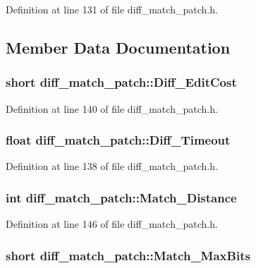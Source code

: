 Definition at line 131 of file diff\_\-match\_\-patch.h.



\subsection{Member Data Documentation}
\hypertarget{classdiff__match__patch_a3a7134ca63b7e4cb44a2432ef4c34121}{
\subsubsection[{Diff\_\-EditCost}]{\setlength{\rightskip}{0pt plus 5cm}short {\bf diff\_\-match\_\-patch::Diff\_\-EditCost}}}
\label{classdiff__match__patch_a3a7134ca63b7e4cb44a2432ef4c34121}


Definition at line 140 of file diff\_\-match\_\-patch.h.

\hypertarget{classdiff__match__patch_aaa544a91d8555a780ab261fc1c15b3f9}{
\subsubsection[{Diff\_\-Timeout}]{\setlength{\rightskip}{0pt plus 5cm}float {\bf diff\_\-match\_\-patch::Diff\_\-Timeout}}}
\label{classdiff__match__patch_aaa544a91d8555a780ab261fc1c15b3f9}


Definition at line 138 of file diff\_\-match\_\-patch.h.

\hypertarget{classdiff__match__patch_a57c49d8f3692157431ecd74fe6cd3f8f}{
\subsubsection[{Match\_\-Distance}]{\setlength{\rightskip}{0pt plus 5cm}int {\bf diff\_\-match\_\-patch::Match\_\-Distance}}}
\label{classdiff__match__patch_a57c49d8f3692157431ecd74fe6cd3f8f}


Definition at line 146 of file diff\_\-match\_\-patch.h.

\hypertarget{classdiff__match__patch_aa99b26cfb171f9ca3d558db26c76346c}{
\subsubsection[{Match\_\-MaxBits}]{\setlength{\rightskip}{0pt plus 5cm}short {\bf diff\_\-match\_\-patch::Match\_\-MaxBits}}}
\label{classdiff__match__patch_aa99b26cfb171f9ca3d558db26c76346c}


